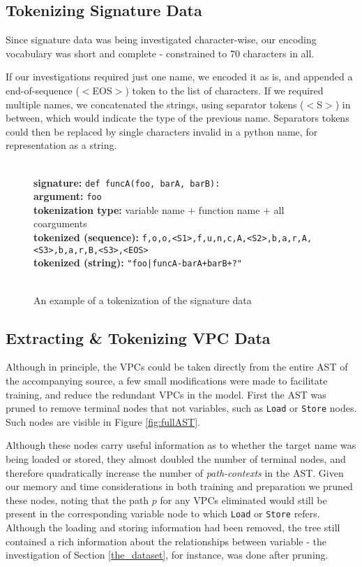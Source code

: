 \subsection{Tokenizing Signature Data}

Since signature data was being investigated character-wise, our encoding vocabulary was short and complete - constrained to 70 characters in all.

If our investigations required just one name, we encoded it as is, and appended a end-of-sequence ($<$EOS$>$) token to the list of characters.
If we required multiple names, we concatenated the strings, using separator tokens ($<$S$>$) in between, which would indicate the type of the previous name. Separators tokens could then be replaced by single characters invalid in a python name, for representation as a string.

\begin{figure}[h!]

\hrulefill\\
    \textbf{signature:} \texttt{def funcA(foo, barA, barB):}\\
    \textbf{argument:} \texttt{foo} \\
    \textbf{tokenization type:} variable name $+$ function name $+$ all coarguments \\
    \textbf{tokenized (sequence):} \texttt{f,o,o,<S1>,f,u,n,c,A,<S2>,b,a,r,A,<S3>,b,a,r,B,<S3>,<EOS>}\\
    \textbf{tokenized (string):} \texttt{"foo|funcA-barA+barB+?"}\\
\hrulefill\\ 
    \caption{An example of a tokenization of the signature data}
    \label{fig:tokenizatio}
\end{figure}

\subsection{Extracting \& Tokenizing VPC Data }
Although in principle, the VPCs could be taken directly from the entire AST of the accompanying source, a few small modifications were made to facilitate training, and reduce the redundant VPCs in the model. 
First the AST was pruned to remove terminal nodes that not variables, such as \texttt{Load} or \texttt{Store} nodes. Such nodes are visible in Figure \ref{fig:fullAST}. 

Although these nodes carry useful information as to whether the target name was being loaded or stored, they almost doubled the number of terminal nodes, and therefore quadratically increase the number of \textit{path-contexts} in the AST. Given our memory and time considerations in both training and preparation we pruned these nodes, noting that the path $p$ for any VPCs eliminated would still be present in the corresponding variable node to which \texttt{Load} or \texttt{Store} refers. 
Although the loading and storing information had been removed, the tree still contained a rich information about the relationships between variable - the investigation of Section \ref{the_dataset}, for instance, was done after pruning.

